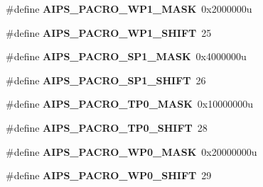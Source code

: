\begin{DoxyCompactItemize}
\item 
\hypertarget{group___a_i_p_s___register___masks_ga228678b7f73628883ad2b57f3127fe3c}{}\#define {\bfseries A\+I\+P\+S\+\_\+\+P\+A\+C\+R\+O\+\_\+\+W\+P1\+\_\+\+M\+A\+S\+K}~0x2000000u\label{group___a_i_p_s___register___masks_ga228678b7f73628883ad2b57f3127fe3c}

\item 
\hypertarget{group___a_i_p_s___register___masks_ga7e390e7dbe191ee0be76d3a3363053a3}{}\#define {\bfseries A\+I\+P\+S\+\_\+\+P\+A\+C\+R\+O\+\_\+\+W\+P1\+\_\+\+S\+H\+I\+F\+T}~25\label{group___a_i_p_s___register___masks_ga7e390e7dbe191ee0be76d3a3363053a3}

\item 
\hypertarget{group___a_i_p_s___register___masks_ga9329c0cf43e281b1360d8e33fe2a3bbc}{}\#define {\bfseries A\+I\+P\+S\+\_\+\+P\+A\+C\+R\+O\+\_\+\+S\+P1\+\_\+\+M\+A\+S\+K}~0x4000000u\label{group___a_i_p_s___register___masks_ga9329c0cf43e281b1360d8e33fe2a3bbc}

\item 
\hypertarget{group___a_i_p_s___register___masks_ga99565adc81e770760009c005553da53f}{}\#define {\bfseries A\+I\+P\+S\+\_\+\+P\+A\+C\+R\+O\+\_\+\+S\+P1\+\_\+\+S\+H\+I\+F\+T}~26\label{group___a_i_p_s___register___masks_ga99565adc81e770760009c005553da53f}

\item 
\hypertarget{group___a_i_p_s___register___masks_ga4f6de33166491a5b7c295151de0113e2}{}\#define {\bfseries A\+I\+P\+S\+\_\+\+P\+A\+C\+R\+O\+\_\+\+T\+P0\+\_\+\+M\+A\+S\+K}~0x10000000u\label{group___a_i_p_s___register___masks_ga4f6de33166491a5b7c295151de0113e2}

\item 
\hypertarget{group___a_i_p_s___register___masks_gadd58dae5c16f3b62ee7266eea13421ab}{}\#define {\bfseries A\+I\+P\+S\+\_\+\+P\+A\+C\+R\+O\+\_\+\+T\+P0\+\_\+\+S\+H\+I\+F\+T}~28\label{group___a_i_p_s___register___masks_gadd58dae5c16f3b62ee7266eea13421ab}

\item 
\hypertarget{group___a_i_p_s___register___masks_gaebfaa790eb3e309083d6accd3db7130f}{}\#define {\bfseries A\+I\+P\+S\+\_\+\+P\+A\+C\+R\+O\+\_\+\+W\+P0\+\_\+\+M\+A\+S\+K}~0x20000000u\label{group___a_i_p_s___register___masks_gaebfaa790eb3e309083d6accd3db7130f}

\item 
\hypertarget{group___a_i_p_s___register___masks_ga899da6b4930497e4f7c236c66ba5675e}{}\#define {\bfseries A\+I\+P\+S\+\_\+\+P\+A\+C\+R\+O\+\_\+\+W\+P0\+\_\+\+S\+H\+I\+F\+T}~29\label{group___a_i_p_s___register___masks_ga899da6b4930497e4f7c236c66ba5675e}


\end{DoxyCompactItemize}
